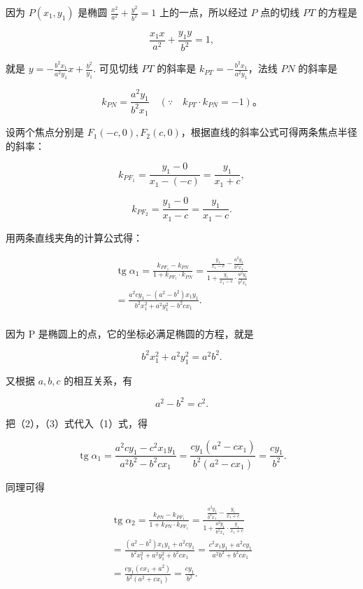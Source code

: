 因为 \(P(x_{1},y_{1})\) 是椭圆 \(\frac{x^2}{a^2} +\frac{y^2}{b^2} = 1\)
上的一点，所以经过 \(P\) 点的切线 \(PT\) 的方程是

\[
\frac {x_{1} x}{a^{2}} + \frac {y_{1} y}{b^{2}} = 1,
\]

就是 \(y = -\frac{b^2x_1}{a^2y_1} x + \frac{b^2}{y_1}.\) 可见切线 \(PT\)
的斜率是 \(k_{PT} = -\frac{b^2x_1}{a^2y_1}\)，法线 \(PN\) 的斜率是

\[
k_{PN} = \frac {a^{2} y_{1}}{b^{2} x_{1}} \quad (\because \quad k_{PT} \cdot k_{PN} = - 1)\text{。}
\]

设两个焦点分别是
\(F_{1}(-c,0), F_{2}(c,0)\)，根据直线的斜率公式可得两条焦点半径的斜率：

\[
k _ {PF_{1}} = \frac {y_{1} - 0}{x_{1} - (- c)} = \frac {y_{1}}{x_{1} + c},
\]

\[
k _ {PF_{2}} = \frac {y_{1} - 0}{x_{1} - c} = \frac {y_{1}}{x_{1} - c}.
\]

用两条直线夹角的计算公式得：

\[
\begin{array}{l} \operatorname{tg} \alpha_{1} = \frac {k _ {PF_{1}} - k_{PN}}{1 + k _ {PF_{1}} \cdot k_{PN}} = \frac {\frac {y_{1}}{x_{1} - c} - \frac {a^{2} y_{1}}{b^{2} x_{1}}}{1 + \frac {y_{1}}{x_{1} - c} \cdot \frac {a^{2} y_{1}}{b^{2} x_{1}}} \\ = \frac {a^{2} c y_{1} - (a^{2} - b^{2}) x_{1} y_{1}}{b^{2} x_{1} ^ {2} + a^{2} y_{1} ^ {2} - b^{2} c x_{1}}. \tag {1} \\ \end{array}
\]

因为 P 是椭圆上的点，它的坐标必满足椭圆的方程，就是

\[
b^{2} x_{1} ^ {2} + a^{2} y_{1} ^ {2} = a^{2} b^{2}. \tag {2}
\]

又根据 \(a, b, c\) 的相互关系，有

\[
a^{2} - b^{2} = c^{2}. \tag {3}
\]

把（2），（3）式代入（1）式，得

\[
\operatorname{tg} \alpha_{1} = \frac {a^{2} c y_{1} - c^{2} x_{1} y_{1}}{a^{2} b^{2} - b^{2} c x_{1}} = \frac {c y_{1} (a^{2} - c x_{1})}{b^{2} (a^{2} - c x_{1})} = \frac {c y_{1}}{b^{2}}. \tag {4}
\]

同理可得

\[
\begin{array}{l} \operatorname{tg} \alpha_{2} = \frac {k_{PN} - k _ {PF_{1}}}{1 + k_{PN} \cdot k _ {PF_{1}}} = \frac {\frac {a^{2} y_{1}}{b^{2} x_{1}} - \frac {y_{1}}{x_{1} + c}}{1 + \frac {a^{2} y_{1}}{b^{2} x_{1}} \cdot \frac {y_{1}}{x_{1} + c}} \\ = \frac {\left(a^{2} - b^{2}\right) x_{1} y_{1} + a^{2} c y_{1}}{b^{2} x_{1} ^ {2} + a^{2} y_{1} ^ {2} + b^{2} c x_{1}} = \frac {c^{2} x_{1} y_{1} + a^{2} c y_{1}}{a^{2} b^{2} + b^{2} c x_{1}} \\ = \frac {c y_{1} (c x_{1} + a^{2})}{b^{2} (a^{2} + c x_{1})} = \frac {c y_{1}}{b^{2}}. \tag {5} \\ \end{array}
\]

